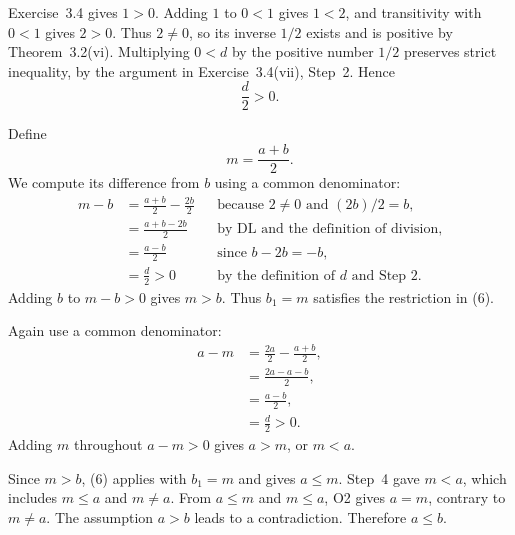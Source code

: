 Exercise~3.4 gives $1>0$. Adding $1$ to $0<1$ gives $1<2$, and
transitivity with $0<1$ gives $2>0$. Thus $2\ne0$, so its inverse
$1/2$ exists and is positive by Theorem~3.2(vi).
Multiplying $0<d$ by the positive number $1/2$ preserves strict
inequality, by the argument in Exercise~3.4(vii), Step~2. Hence
\[
 \frac d2>0.
\]

Define
\[
 m=\frac{a+b}{2}.
\]
We compute its difference from $b$ using a common denominator:
\begin{align*}
 m-b
   &=\frac{a+b}{2}-\frac{2b}{2}
       &&\text{because $2\ne0$ and $(2b)/2=b$},\\
   &=\frac{a+b-2b}{2}
       &&\text{by DL and the definition of division},\\
   &=\frac{a-b}{2}
       &&\text{since $b-2b=-b$},\\
   &=\frac d2>0
       &&\text{by the definition of $d$ and Step~2}.
\end{align*}
Adding $b$ to $m-b>0$ gives $m>b$. Thus $b_1=m$ satisfies the
restriction in (6).

Again use a common denominator:
\begin{align*}
 a-m
   &=\frac{2a}{2}-\frac{a+b}{2},\\
   &=\frac{2a-a-b}{2},\\
   &=\frac{a-b}{2},\\
   &=\frac d2>0.
\end{align*}
Adding $m$ throughout $a-m>0$ gives $a>m$, or $m<a$.

Since $m>b$, (6) applies with $b_1=m$ and gives $a\le m$.
Step~4 gave $m<a$, which includes $m\le a$ and $m\ne a$.
From $a\le m$ and $m\le a$, O2 gives $a=m$, contrary to $m\ne a$.
The assumption $a>b$ leads to a contradiction. Therefore $a\le b$.

